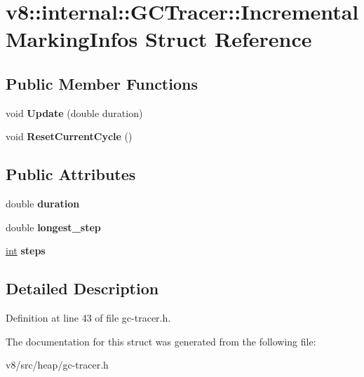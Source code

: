 \hypertarget{structv8_1_1internal_1_1GCTracer_1_1IncrementalMarkingInfos}{}\section{v8\+:\+:internal\+:\+:G\+C\+Tracer\+:\+:Incremental\+Marking\+Infos Struct Reference}
\label{structv8_1_1internal_1_1GCTracer_1_1IncrementalMarkingInfos}
\subsection*{Public Member Functions}
\begin{DoxyCompactItemize}
\item 
\mbox{\label{structv8_1_1internal_1_1GCTracer_1_1IncrementalMarkingInfos_aedad87fe3eff9573b6bdb04434bd0fd9}} 
void {\bfseries Update} (double duration)
\item 
\mbox{\label{structv8_1_1internal_1_1GCTracer_1_1IncrementalMarkingInfos_a31f0a1f52d9b650e849557aee34e1528}} 
void {\bfseries Reset\+Current\+Cycle} ()
\end{DoxyCompactItemize}
\subsection*{Public Attributes}
\begin{DoxyCompactItemize}
\item 
\mbox{\label{structv8_1_1internal_1_1GCTracer_1_1IncrementalMarkingInfos_a5e95e79c9f15fae91f25bbfb1bfe09a6}} 
double {\bfseries duration}
\item 
\mbox{\label{structv8_1_1internal_1_1GCTracer_1_1IncrementalMarkingInfos_acede4891be40a84294b45b1f67e79073}} 
double {\bfseries longest\+\_\+step}
\item 
\mbox{\label{structv8_1_1internal_1_1GCTracer_1_1IncrementalMarkingInfos_a756626db580c6f90bb64e7eb6cfa2b75}} 
\mbox{\hyperlink{classint}{int}} {\bfseries steps}
\end{DoxyCompactItemize}


\subsection{Detailed Description}


Definition at line 43 of file gc-\/tracer.\+h.



The documentation for this struct was generated from the following file\+:\begin{DoxyCompactItemize}
\item 
v8/src/heap/gc-\/tracer.\+h\end{DoxyCompactItemize}

